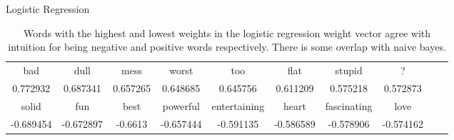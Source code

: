 \documentclass[11pt]{article}
\begin{document}
\begin{subsection}{Logistic Regression}
\begin{table}[h]
\centering
\begin{tabular}{cccccccccc}
 \midrule
bad & dull & mess  & worst & too &flat & stupid&? \\
   0.772932 & 0.687341& 0.657265 &0.648685&0.645756&0.611209 & 0.575218 &  0.572873 \\
 \bottomrule
 \bottomrule
 solid  & fun& best & powerful & entertaining & heart & fascinating & love \\
  -0.689454 & -0.672897& -0.6613 & -0.657444 & -0.591135 &  -0.586589 &-0.578906 & -0.574162 \\
 \bottomrule
\end{tabular}
\caption{\label{tab:logwords} Words with the highest and lowest weights in the logistic regression weight vector agree with intuition for being negative and positive words respectively. There is some overlap with naive bayes.}
\end{table}

\end{subsection}
\end{document}

